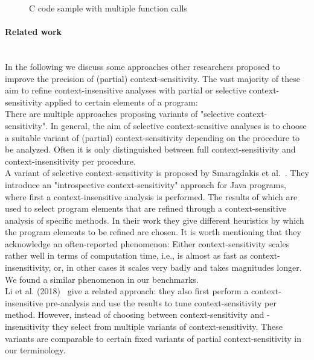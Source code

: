   \begin{figure}
    \centering
    \begin{subfigure}{0.35\textwidth}
      \centering
      
    \end{subfigure}
    \caption{C code sample with multiple function calls}
    \label{fig:exampleIntro}
  \end{figure}


\paragraph{Related work}\mbox{}\\
In the following we discuss some approaches other researchers proposed to improve the precision of (partial) context-sensitivity. The vast majority of these aim to refine context-insensitive analyses with partial or selective context-sensitivity applied to certain elements of a program:\\
There are multiple approaches proposing variants of "selective context-sensitivity". In general, the aim of selective context-sensitive analyses is to choose a suitable variant of (partial) context-sensitivity depending on the procedure to be analyzed. Often it is only distinguished between full context-sensitivity and context-insensitivity per procedure.\\
A variant of selective context-sensitivity is proposed by Smaragdakis et al.~\parencite{smaragdakis2014introspective}. They introduce an "introspective context-sensitivity" approach for Java programs, where first a context-insensitive analysis is performed. The results of which are used to select program elements that are refined through a context-sensitive analysis of specific methods. In their work they give different heuristics by which the program elements to be refined are chosen. It is worth mentioning that they acknowledge an often-reported phenomenon: Either context-sensitivity scales rather well in terms of computation time, i.e., is almost as fast as context-insensitivity, or, in other cases it scales very badly and takes magnitudes longer. We found a similar phenomenon in our benchmarks.\\
Li et al. (2018)~\parencite{li2018scalability} give a related approach: they also first perform a context-insensitive pre-analysis and use the results to tune context-sensitivity per method. However, instead of choosing between context-sensitivity and -insensitivity they select from multiple variants of context-sensitivity. These variants are comparable to certain fixed variants of partial context-sensitivity in our terminology.\\
